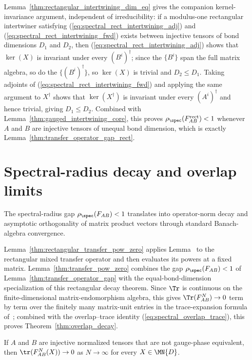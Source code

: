 Lemma~\ref{thm:rectangular_intertwining_dim_eq} gives the companion
kernel-invariance argument, independent of irreducibility: if a modulus-one
rectangular intertwiner satisfying (\ref{eq:spectral_rect_intertwining_adj}) and
(\ref{eq:spectral_rect_intertwining_fwd}) exists between
injective tensors of bond dimensions $D_1$ and $D_2$, then
(\ref{eq:spectral_rect_intertwining_adj}) shows that $\ker(X)$ is invariant under every $(B^i)^\dagger$;
since the $\{B^i\}$ span the full matrix algebra, so do the
$\{(B^i)^\dagger\}$, so $\ker(X)$ is trivial and $D_2\leq D_1$. Taking
adjoints of (\ref{eq:spectral_rect_intertwining_fwd}) and applying the same argument to
$X^\dagger$ shows that $\ker(X^\dagger)$ is invariant under every
$(A^i)^\dagger$ and hence trivial, giving $D_1\leq D_2$. Combined with
Lemma~\ref{thm:gauged_intertwining_core}, this proves
$\rho_{\spec}(F_{AB}^{\mathrm{rect}})<1$ whenever $A$ and $B$ are injective
tensors of unequal bond dimension, which is exactly
Lemma~\ref{thm:transfer_operator_gap_rect}.

\section{Spectral-radius decay and overlap limits}
\label{sec:app_spectral_decay}

The spectral-radius gap $\rho_{\spec}(F_{AB}) < 1$ translates into
operator-norm decay and asymptotic orthogonality of matrix product vectors
through standard Banach-algebra convergence.


Lemma~\ref{thm:rectangular_transfer_pow_zero} applies
Lemma~\cite[``Powers vanish below unit spectral radius'']{QICLean2026Blueprint} to the rectangular mixed transfer
operator and then evaluates its powers at a fixed matrix.
Lemma~\ref{thm:transfer_pow_zero} combines the gap
$\rho_{\spec}(F_{AB})<1$ of Lemma~\ref{thm:transfer_operator_gap} with the
equal-bond-dimension specialization of this rectangular decay theorem.
Since $\Tr$ is continuous on the finite-dimensional matrix-endomorphism
algebra, this gives $\Tr(F_{AB}^N)\to0$ term by term over the finitely many
matrix-unit entries in the trace-expansion formula
of~\cite[``Trace expansion over matrix units'']{QICLean2026Blueprint}; combined with
the overlap--trace identity (\ref{eq:spectral_overlap_trace}), this proves
Theorem~\ref{thm:overlap_decay}.

\begin{lemma}\label{thm:cross_decay}
    \leanok
    If $A$ and $B$ are injective normalized tensors that are not gauge-phase
    equivalent, then $\tr(F_{AB}^N(X))\to0$ as $N\to\infty$ for every
    $X\in\MN{D}$.
\end{lemma}


